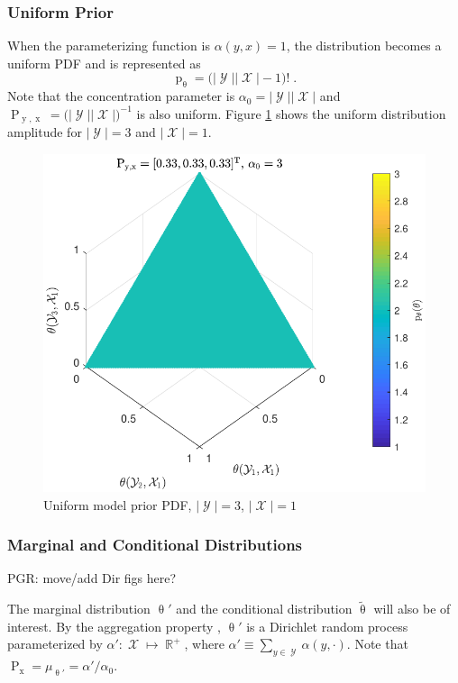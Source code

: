 \documentclass[12pt]{article}
\DeclareMathOperator{\xrm}{\mathrm{x}}
\DeclareMathOperator{\yrm}{\mathrm{y}}
\DeclareMathOperator{\Prm}{\mathrm{P}}
\DeclareMathOperator{\prm}{\mathrm{p}}
\DeclareMathOperator{\Xcal}{\mathcal{X}}
\DeclareMathOperator{\Ycal}{\mathcal{Y}}
\DeclareMathOperator{\Rbb}{\mathbb{R}}
\begin{document}
\subsubsection{Uniform Prior}

When the parameterizing function is $\alpha(y,x) = 1$, the distribution becomes a uniform PDF and is represented as
\begin{equation}
\prm_{\uptheta} = \big( |\Ycal||\Xcal|-1 \big)! \;.
\end{equation}
Note that the concentration parameter is $\alpha_0 = |\Ycal||\Xcal|$ and $\Prm_{\yrm,\xrm} = \big( |\Ycal||\Xcal| \big)^{-1}$ is also uniform. Figure \ref{fig:P_theta_uniform} shows the uniform distribution amplitude for $|\Ycal| = 3$ and $|\Xcal| = 1$.

\begin{figure}
\centering
\includegraphics[width=0.7\linewidth]{P_theta_uniform.pdf}
\caption{Uniform model prior PDF, $|\Ycal| = 3$, $|\Xcal| = 1$}
\label{fig:P_theta_uniform}
\end{figure}



\subsubsection{Marginal and Conditional Distributions}

PGR: move/add Dir figs here?

The marginal distribution $\uptheta'$ and the conditional distribution $\tilde{\uptheta}$ will also be of interest. By the aggregation property \cite{ferguson}, $\uptheta'$ is a Dirichlet random process parameterized by $\alpha' : \Xcal \mapsto \Rbb^+$, where $\alpha' \equiv \sum_{y \in \Ycal} \alpha(y,\cdot)$. Note that $\Prm_{\xrm} = \mu_{\uptheta'} = \alpha' / \alpha_0$.
\end{document}
